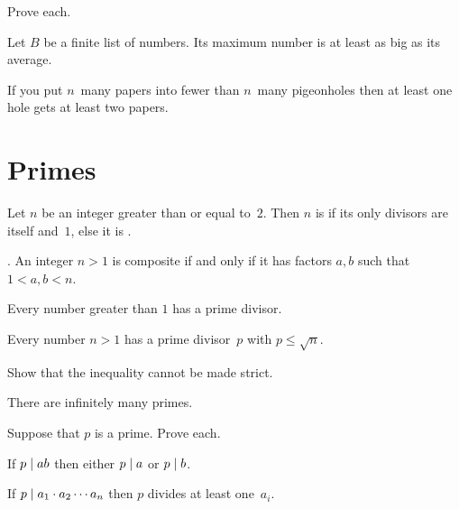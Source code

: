 \documentclass{ibl}
\begin{document}
\begin{ex}  Prove each.
\begin{exes}
\item Let $B$ be a finite list of numbers.
  Its maximum number is at least as big as its average.
\item If you put $n$~many papers into fewer than $n$~many 
  pigeonholes then at least one hole gets at least two papers.    
\end{exes}
\end{ex}




\section{Primes}
\begin{df}
Let $n$ be an integer greater than or equal to~$2$.
Then $n$ is  if its only divisors are itself and~$1$,
else it is .  
\end{df}

\begin{ex}\pord.
An integer $n>1$ is composite if and only if it has factors $a,b$ such that
$1<a,b<n$.  
\end{ex}

\begin{ex}
\begin{exes}
\item Every number greater than $1$ has a prime divisor.
\item Every number $n>1$ has a prime divisor~$p$ with $p\leq \sqrt{n}$.
\item Show that the inequality cannot be made strict.     
\end{exes}
\end{ex}

\begin{ex}
There are infinitely many primes.  
\end{ex}

\begin{ex} Suppose that $p$ is a prime.  Prove each.
\begin{exes}
\item If  $p\mid ab$ then either $p\mid a$ or
$p\mid b$.
\item If $p\mid a_1\cdot a_2\cdots a_n$ then 
$p$ divides at least one~$a_i$.    
\end{exes}
\end{ex}
\end{document}
